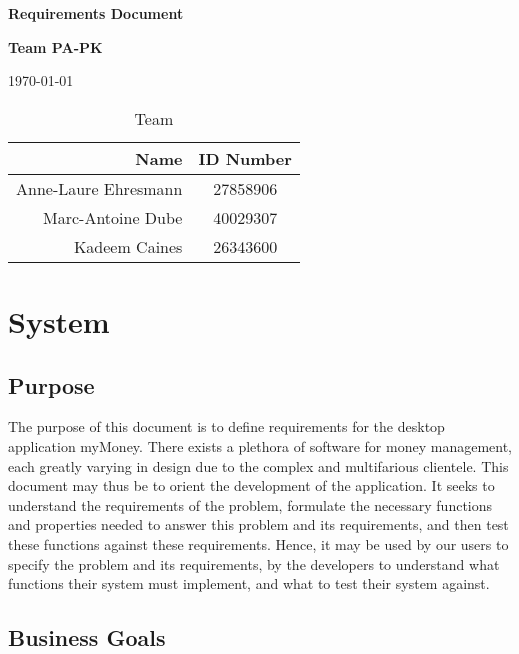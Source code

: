 \documentclass[11pt]{article}
\newcounter{use case ID}
\begin{document}
\vspace*{0.5in}
\centerline{\bf\Large Requirements Document}

\vspace*{0.5in}
\centerline{\bf\Large Team PA-PK}

\vspace*{0.5in}
\centerline{\today}

\vspace*{1.5in}
\begin{table}[htbp]
\caption{Team}
\begin{center}
\begin{tabular}{|r | c|}
\hline
Name & ID Number \\
\hline\hline
Anne-Laure Ehresmann & 27858906 \\
\hline
Marc-Antoine Dube & 40029307 \\
\hline
Kadeem Caines & 26343600 \\
\hline
\end{tabular}
\end{center}
\end{table}

\tableofcontents
\listoffigures
\listoftables

\clearpage

\section{System}\subsection{Purpose}

The purpose of this document is to define requirements for the  desktop application myMoney.
There exists a plethora of software for money management, each greatly varying in design due to the complex and multifarious clientele. This document may thus be to orient the development of the application. It seeks to understand the requirements of the problem, formulate the necessary functions and properties needed to answer this problem and its requirements, and then test these functions against these requirements. Hence, it may be used by our users to specify the problem and its requirements, by the developers to understand what functions their system must implement, and what to test their system against.

\subsection{Business Goals}
\end{document}
